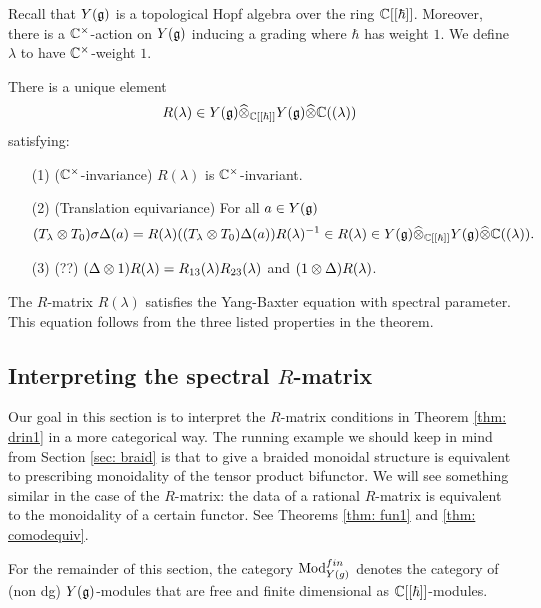 \documentclass[11pt]{amsart}
\begin{document}
Recall that $Y(\mathfrak g)$ is a topological Hopf algebra over the ring $\mathbb C[[\hbar]]$. 
Moreover, there is a $\mathbb C^\times$-action on $Y(\mathfrak g)$ inducing a grading where $\hbar$ has weight $1$. 
We define $\lambda$ to have $\mathbb C^\times$-weight $1$.


\begin{thm} \label{thm: drin1}
There is a unique element 
\[
R(\lambda) \in Y(\mathfrak g) \widehat{\otimes}_{\mathbb C[[\hbar]]} Y(\mathfrak g) \widehat{\otimes} \mathbb C((\lambda))
\]
satisfying:
\begin{enumerate}
\item[(1)]\label{invariance} ($\mathbb C^\times$-invariance) $R(\lambda)$ is $\mathbb C^\times$-invariant. 
\item[(2)]\label{equiv} (Translation equivariance)
For all $a \in Y(\mathfrak g)$ 
\[
(T_\lambda \otimes T_0) \sigma \Delta(a) = R(\lambda) ((T_\lambda \otimes T_0) \Delta(a)) R(\lambda)^{-1} \in R(\lambda) \in Y(\mathfrak g) \widehat{\otimes}_{\mathbb C[[\hbar]]} Y(\mathfrak g) \widehat{\otimes} \mathbb C((\lambda)) .
\]
\item[(3)] \label{R3} (??) $(\Delta \otimes 1) R(\lambda) = R_{13}(\lambda) R_{23}(\lambda)$ and $(1 \otimes \Delta) R(\lambda)$. 
\end{enumerate}
\end{thm}

\begin{rmk}
The $R$-matrix $R(\lambda)$ satisfies the Yang-Baxter equation with spectral parameter. 
This equation follows from the three listed properties in the theorem. 
\end{rmk}

\def\ymodfin{{\rm Mod}_{Y(g)}^{fin}}

\subsection{Interpreting the spectral $R$-matrix}

Our goal in this section is to interpret the $R$-matrix conditions in Theorem \ref{thm: drin1} in a more categorical way. 
The running example we should keep in mind from Section \ref{sec: braid} is that to give a braided monoidal structure is equivalent to prescribing monoidality of the tensor product bifunctor. 
We will see something similar in the case of the $R$-matrix: the data of a rational $R$-matrix is equivalent to the monoidality of a certain functor.
See Theorems \ref{thm: fun1} and \ref{thm: comodequiv}. 

For the remainder of this section, the category $\ymodfin$ denotes the category of (non dg) $Y(\mathfrak g)$-modules that are free and finite dimensional as $\mathbb C[[\hbar]]$-modules. 
\end{document}
